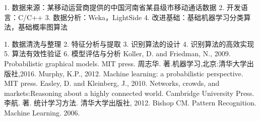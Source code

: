 \assignReq
{1. 数据来源：某移动运营商提供的中国河南省某县级市移动通话数据}
{2. 开发语言：C/C++}
{3. 数据分析：Weka，LightSide}
{4. 改进基础：基础机器学习分类算法，基础概率图算法}

\assignWork
{1. 数据清洗与整理}
{2. 特征分析与提取}
{3. 识别算法的设计}
{4. 识别算法的高效实现}
{5. 算法有效性验证}
{6. 模型评估与分析}
\assignRef
{Koller, D. and Friedman, N., 2009. Probabilistic graphical models. MIT press.}
{周志华. 著.机器学习,北京:清华大学出版社,2016. }
{Murphy, K.P., 2012. Machine learning: a probabilistic perspective. MIT press.}
{Easley, D. and Kleinberg, J., 2010. Networks, crowds, and markets:Reasoning} 
{about a highly connected world. Cambridge University Press.}
{李航. 著. 统计学习方法. 清华大学出版社, 2012.}
{Bishop CM. Pattern Recognition. Machine Learning. 2006.}


